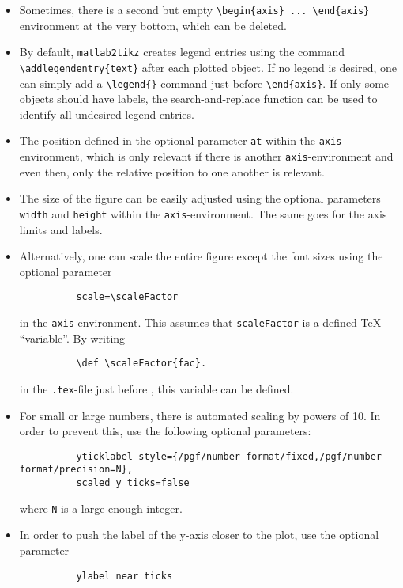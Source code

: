 \documentclass{article}
\begin{document}
\begin{itemize}[itemsep=0pt]
	\item Sometimes, there is a second but empty \verb|\begin{axis} ... \end{axis}| environment at the very bottom, which can be deleted.
	\item By default, \verb|matlab2tikz| creates legend entries using the command \verb|\addlegendentry{text}| after each plotted object. If no legend is desired, one can simply add a \verb|\legend{}| command just before \verb|\end{axis}|. If only some objects should have labels, the search-and-replace function can be used to identify all undesired legend entries.
	\item The position defined in the optional parameter \verb|at| within the \verb|axis|-environment, which is only relevant if there is another \verb|axis|-environment and even then, only the relative position to one another is relevant.
	\item The size of the figure can be easily adjusted using the optional parameters \verb|width| and \verb|height| within the \verb|axis|-environment. The same goes for the axis limits and labels.
	\item Alternatively, one can scale the entire figure except the font sizes using the optional parameter
		\begin{verbatim}
		  scale=\scaleFactor
		\end{verbatim}
		in the \verb|axis|-environment. This assumes that \verb|scaleFactor| is a defined TeX ``variable''.
		By writing
		\begin{verbatim}
		  \def \scaleFactor{fac}.
		\end{verbatim}
		in the \verb|.tex|-file just before \verb||, this variable can be defined.
	\item For small or large numbers, there is automated scaling by powers of 10. In order to prevent this, use the following optional parameters:
		\begin{verbatim}
		  yticklabel style={/pgf/number format/fixed,/pgf/number format/precision=N},
		  scaled y ticks=false
		\end{verbatim}
		where \verb|N| is a large enough integer.
	\item In order to push the label of the y-axis closer to the plot, use the optional parameter
		\begin{verbatim}
		  ylabel near ticks
		\end{verbatim}

\end{itemize}
\end{document}
